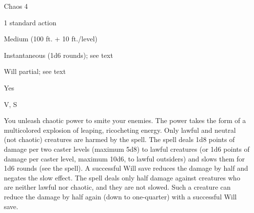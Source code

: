 
\begin{description*}
\item[Level:] Chaos 4
\item[Casting Time:] 1 standard action
\item[Range:] Medium (100 ft. + 10 ft./level)
\item[Duration:] Instantaneous (1d6 rounds); see text
\item[Saving Throw:] Will partial; see text
\item[Spell Resistance:] Yes
\item[Components:] V, S
\end{description*}

You unleash chaotic power to smite your enemies. The power takes the form of a
multicolored explosion of leaping, ricocheting energy. Only lawful and neutral
(not chaotic) creatures are harmed by the spell.
The spell deals 1d8 points of damage per two caster levels (maximum 5d8) to lawful
creatures (or 1d6 points of damage per caster level, maximum 10d6, to lawful outsiders)
and slows them for 1d6 rounds (see the  spell). A successful Will
save reduces the damage by half and negates the slow effect.
The spell deals only half damage against creatures who are neither lawful nor chaotic,
and they are not slowed. Such a creature can reduce the damage by half again (down
to one-quarter) with a successful Will save.